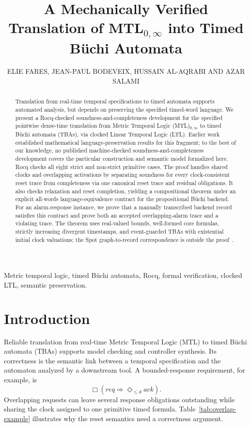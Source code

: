 \documentclass{ieeeaccess}
\title{A Mechanically Verified Translation of MTL$_{0,\infty}$ into Timed B\"uchi Automata}
\author{\uppercase{Elie Fares}\authorrefmark{1},
\uppercase{Jean-Paul Bodeveix}\authorrefmark{2},
\uppercase{Hussain Al-Aqrabi}\authorrefmark{1} AND
\uppercase{Azar Salami}\authorrefmark{1}}
\begin{document}
\history{}
\doi{}

\begin{abstract}
Translation from real-time temporal specifications to timed automata supports
automated analysis, but depends on preserving the specified timed-word
language. We present a Rocq-checked soundness-and-completeness development for
the specified pointwise dense-time translation from Metric Temporal Logic
(MTL)$_{0,\infty}$ to timed B\"uchi automata (TBAs), via clocked Linear
Temporal Logic (LTL). Earlier work established mathematical language-preservation
results for this fragment; to the best of our knowledge, no published
machine-checked soundness-and-completeness development covers the particular
construction and semantic model formalized here. Rocq checks all eight strict
and non-strict primitive cases. The proof handles shared clocks and overlapping
activations by separating soundness for every clock-consistent reset trace
from completeness via one canonical reset trace and residual obligations. It
also checks relaxation and reset completion, yielding a compositional theorem
under an explicit all-words language-equivalence contract for the propositional
B\"uchi backend. For an alarm-response instance, we prove that a manually
transcribed backend record satisfies this contract and prove both an accepted
overlapping-alarm trace and a violating trace. The theorem uses real-valued
bounds, well-formed core formulas, strictly increasing divergent timestamps,
and event-guarded TBAs with existential initial clock valuations; the Spot
graph-to-record correspondence is outside the proof~\cite{openai_codex}.
\end{abstract}

\begin{keywords}
Metric temporal logic, timed B\"uchi automata, Rocq, formal verification,
clocked LTL, semantic preservation.
\end{keywords}
\maketitle

\section{Introduction}
\label{sec:introduction}
Reliable translation from real-time Metric Temporal Logic (MTL) to timed
B\"uchi automata (TBAs) supports model checking and controller synthesis. Its
correctness is the semantic link between a temporal specification and the
automaton analyzed by a downstream tool. A bounded-response requirement, for example, is
\begin{equation*}
\Box(\mathit{req}\Rightarrow\Diamond_{\le d}\mathit{ack}).
\end{equation*}
Overlapping requests can leave several response obligations outstanding while
sharing the clock assigned to one primitive timed formula. Table~\ref{tab:overlap-example}
illustrates why the reset semantics need a correctness argument.
\end{document}
